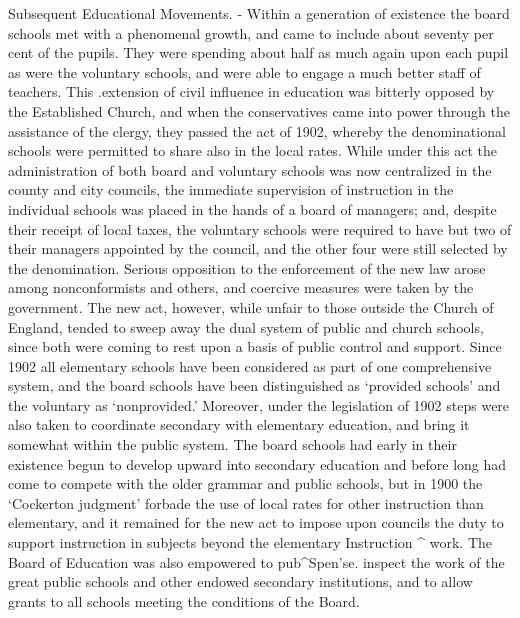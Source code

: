 \documentclass[
]{book}
\begin{document}
Subsequent Educational Movements. - Within a generation of existence the board schools met with a phenom\protect\hypertarget{ch25.xmlux5cux23para.467.2.0.box.296.236.1055.1721.q.60}{}{enal growth, and came to include about seventy per cent of the pupils. They were spending about half as much again upon each pupil as were the voluntary schools, and were able to engage a much better staff of teachers. This .extension of civil influence in education was bitterly opposed by the Established Church, and when the conservatives came into power through the assistance of the clergy, they passed the act of 1902, whereby the denominational schools were permitted to share also in the local rates. While under this act the administration of both board and voluntary schools was now centralized in the county and city councils, the immediate supervision of instruction in the individual schools was placed in the hands of a board of managers; and, despite their receipt of local taxes, the voluntary schools were required to have but two of their managers appointed by the council, and the other four were still selected by the denomination. Serious opposition to the enforcement of the new law arose among nonconformists and others, and coercive measures were taken by the government. The new act, however, while unfair to those outside the Church of England, tended to sweep away the dual system of public and church schools, since both were coming to rest upon a basis of public control and support. Since 1902 all elementary schools have been considered as part of one comprehensive system, and the board schools have been distinguished as `provided schools' and the voluntary as `nonprovided.' Moreover, under the legislation of 1902 steps were also taken to coordinate secondary with elementary education, and bring it somewhat within the public system. The board schools had early in their existence begun to develop upward into}\protect\hypertarget{ch25.xmlux5cux23para.468.1.0.box.114.234.1264.530.q.60}{}{ secondary education and before long had come to compete with the older grammar and public schools, but in 1900 the `Cockerton judgment' forbade the use of local rates for other instruction than elementary, and it remained for the new act to impose upon councils the duty to support instruction in subjects beyond the elementary Instruction \^{} work. The Board of Education was also empowered to pub\^{}Spen'se. inspect the work of the great public schools and other endowed secondary institutions, and to allow grants to all schools meeting the conditions of the Board.}
\end{document}
